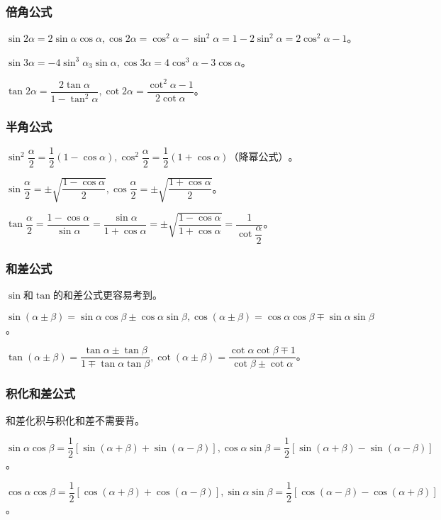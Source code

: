 \documentclass[UTF8, 12pt]{ctexart}
\begin{document}
\subsubsection{倍角公式}

$\sin 2\alpha=2\sin\alpha\cos\alpha,\cos 2\alpha=\cos^2\alpha-\sin^2\alpha=1-2\sin^2\alpha=2\cos^2\alpha-1$。

$\sin 3\alpha=-4\sin^3\alpha_3\sin\alpha,\cos 3\alpha=4\cos^3\alpha-3\cos\alpha$。

$\tan 2\alpha=\dfrac{2\tan\alpha}{1-\tan^2\alpha},\cot 2\alpha=\dfrac{\cot^2\alpha-1}{2\cot\alpha}$。

\subsubsection{半角公式}

$\sin^2\dfrac{\alpha}{2}=\dfrac{1}{2}(1-\cos\alpha),\cos^2\dfrac{\alpha}{2}=\dfrac{1}{2}(1+\cos\alpha)\text{（降幂公式）}$。

$\sin\dfrac{\alpha}{2}=\pm\sqrt{\dfrac{1-\cos\alpha}{2}},\cos\dfrac{\alpha}{2}=\pm\sqrt{\dfrac{1+\cos\alpha}{2}}$。

$\tan\dfrac{\alpha}{2}=\dfrac{1-\cos\alpha}{\sin\alpha}=\dfrac{\sin\alpha}{1+\cos\alpha}=\pm\sqrt{\dfrac{1-\cos\alpha}{1+\cos\alpha}}=\dfrac{1}{\cot\dfrac{\alpha}{2}}$。

\subsubsection{和差公式}

$\sin$和$\tan$的和差公式更容易考到。

$\sin(\alpha\pm\beta)=\sin\alpha\cos\beta\pm\cos\alpha\sin\beta,\cos(\alpha\pm\beta)=\cos\alpha\cos\beta\mp\sin\alpha\sin\beta$。

$\tan(\alpha\pm\beta)=\dfrac{\tan\alpha\pm\tan\beta}{1\mp\tan\alpha\tan\beta},\cot(\alpha\pm\beta)=\dfrac{\cot\alpha\cot\beta\mp 1}{\cot\beta\pm\cot\alpha}$。

\subsubsection{积化和差公式}

和差化积与积化和差不需要背。

$\sin\alpha\cos\beta=\dfrac{1}{2}[\sin(\alpha+\beta)+\sin(\alpha-\beta)],\cos\alpha\sin\beta=\dfrac{1}{2}[\sin(\alpha+\beta)-\sin(\alpha-\beta)]$。

$\cos\alpha\cos\beta=\dfrac{1}{2}[\cos(\alpha+\beta)+\cos(\alpha-\beta)],\sin\alpha\sin\beta=\dfrac{1}{2}[\cos(\alpha-\beta)-\cos(\alpha+\beta)]$。
\end{document}
